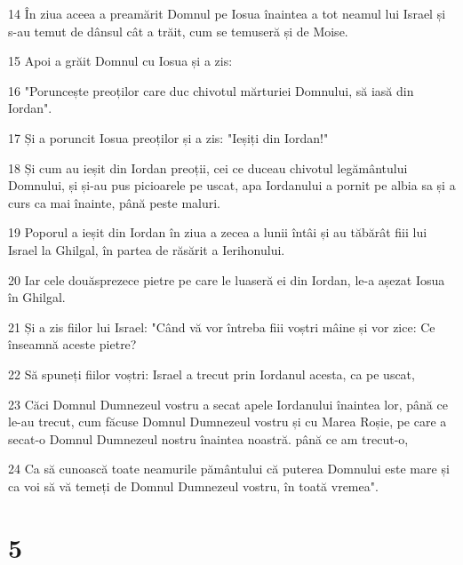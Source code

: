 \par 14 În ziua aceea a preamărit Domnul pe Iosua înaintea a tot neamul lui Israel și s-au temut de dânsul cât a trăit, cum se temuseră și de Moise.
\par 15 Apoi a grăit Domnul cu Iosua și a zis:
\par 16 "Poruncește preoților care duc chivotul mărturiei Domnului, să iasă din Iordan".
\par 17 Și a poruncit Iosua preoților și a zis: "Ieșiți din Iordan!"
\par 18 Și cum au ieșit din Iordan preoții, cei ce duceau chivotul legământului Domnului, și și-au pus picioarele pe uscat, apa Iordanului a pornit pe albia sa și a curs ca mai înainte, până peste maluri.
\par 19 Poporul a ieșit din Iordan în ziua a zecea a lunii întâi și au tăbărât fiii lui Israel la Ghilgal, în partea de răsărit a Ierihonului.
\par 20 Iar cele douăsprezece pietre pe care le luaseră ei din Iordan, le-a așezat Iosua în Ghilgal.
\par 21 Și a zis fiilor lui Israel: "Când vă vor întreba fiii voștri mâine și vor zice: Ce înseamnă aceste pietre?
\par 22 Să spuneți fiilor voștri: Israel a trecut prin Iordanul acesta, ca pe uscat,
\par 23 Căci Domnul Dumnezeul vostru a secat apele Iordanului înaintea lor, până ce le-au trecut, cum făcuse Domnul Dumnezeul vostru și cu Marea Roșie, pe care a secat-o Domnul Dumnezeul nostru înaintea noastră. până ce am trecut-o,
\par 24 Ca să cunoască toate neamurile pământului că puterea Domnului este mare și ca voi să vă temeți de Domnul Dumnezeul vostru, în toată vremea".

\chapter{5}

